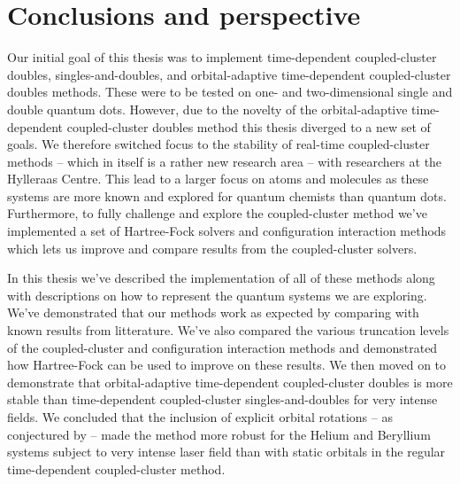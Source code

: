 \chapter{Conclusions and perspective}
    Our initial goal of this thesis was to implement time-dependent
    coupled-cluster doubles, singles-and-doubles, and orbital-adaptive
    time-dependent coupled-cluster doubles methods.
    These were to be tested on one- and two-dimensional single and double
    quantum dots.
    However, due to the novelty of the  orbital-adaptive time-dependent
    coupled-cluster doubles method this thesis diverged to a new set of goals.
    We therefore switched focus to the stability of real-time coupled-cluster
    methods -- which in itself is a rather new research area -- with researchers
    at the Hylleraas Centre.
    This lead to a larger focus on atoms and molecules as these systems are more
    known and explored for quantum chemists than quantum dots.
    Furthermore, to fully challenge and explore the coupled-cluster method we've
    implemented a set of Hartree-Fock solvers and configuration interaction
    methods which lets us improve and compare results from the coupled-cluster
    solvers.

    In this thesis we've described the implementation of all of these methods
    along with descriptions on how to represent the quantum systems we are
    exploring.
    We've demonstrated that our methods work as expected by comparing with known
    results from litterature.
    We've also compared the various truncation levels of the coupled-cluster
    and configuration interaction methods and demonstrated how Hartree-Fock can
    be used to improve on these results.
    We then moved on to demonstrate that orbital-adaptive time-dependent
    coupled-cluster doubles is more stable than time-dependent coupled-cluster
    singles-and-doubles for very intense fields.
    We concluded that the inclusion of explicit orbital rotations -- as
    conjectured by \citeauthor{pedersen2018symplectic}
    \cite{pedersen2018symplectic} -- made the method more robust for the Helium
    and Beryllium systems subject to very intense laser field than with static
    orbitals in the regular time-dependent coupled-cluster method.

